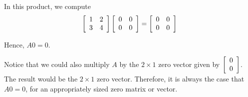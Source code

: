 \begin{solution} 
In this product, we compute
\begin{equation*}
\left[
\begin{array}{rr}
1 & 2 \\
3 & 4
\end{array}
\right]
\left[
\begin{array}{rr}
0 & 0 \\
0 & 0
\end{array}
\right]
=
\left[
\begin{array}{rr}
0 & 0 \\
0 & 0
\end{array}
\right]
\end{equation*}

Hence, $A0=0$. 
\end{solution}

Notice that we could also multiply $A$ by the $2 \times 1 $ zero vector given by $\left[
\begin{array}{r}
0 \\
0
\end{array}
\right]$.
The result would be the $2 \times 1$ zero vector. 
Therefore, it is always the case that $A0=0$, for an appropriately sized zero matrix or vector. 

